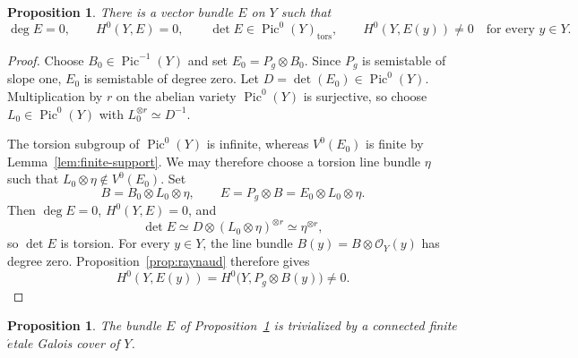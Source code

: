 \documentclass[a4paper]{amsart}
\newtheorem{proposition}[theorem]{Proposition}
\theoremstyle{remark}
\DeclareMathOperator{\Pic}{Pic}
\newcommand{\OO}{\mathcal O}
\newcommand{\tors}{\mathrm{tors}}
\begin{document}
\begin{proposition}\label{prop:auxiliary-bundle}
There is a vector bundle \(E\) on \(Y\) such that
\[
 \deg E=0,\qquad H^0(Y,E)=0,\qquad
 \det E\in\Pic^0(Y)_{\tors},\qquad
 H^0(Y,E(y))\neq 0\quad\text{for every }y\in Y.
\]
\end{proposition}

\begin{proof}
Choose \(B_0\in\Pic^{-1}(Y)\) and set \(E_0=P_g\otimes B_0\).  Since \(P_g\) is semistable of slope one, \(E_0\) is semistable of degree zero.  Let \(D=\det(E_0)\in\Pic^0(Y)\).  Multiplication by \(r\) on the abelian variety \(\Pic^0(Y)\) is surjective, so choose \(L_0\in\Pic^0(Y)\) with
\(L_0^{\otimes r}\simeq D^{-1}\).

The torsion subgroup of \(\Pic^0(Y)\) is infinite, whereas \(V^0(E_0)\) is finite by Lemma~\ref{lem:finite-support}.  We may therefore choose a torsion line bundle \(\eta\) such that
\(L_0\otimes\eta\notin V^0(E_0)\).  Set
\[
 B=B_0\otimes L_0\otimes\eta,
 \qquad
 E=P_g\otimes B=E_0\otimes L_0\otimes\eta.
\]
Then \(\deg E=0\), \(H^0(Y,E)=0\), and
\[
 \det E
 \simeq D\otimes(L_0\otimes\eta)^{\otimes r}
 \simeq\eta^{\otimes r},
\]
so \(\det E\) is torsion.  For every \(y\in Y\), the line bundle
\(B(y)=B\otimes\OO_Y(y)\) has degree zero.  Proposition~\ref{prop:raynaud} therefore gives
\[
 H^0(Y,E(y))
 =H^0\bigl(Y,P_g\otimes B(y)\bigr)\neq 0.
\]
\end{proof}

\begin{proposition}\label{prop:trivialization}
The bundle \(E\) of Proposition~\ref{prop:auxiliary-bundle} is trivialized by a connected finite \(\acute{e}\)tale Galois cover of \(Y\).
\end{proposition}
\end{document}
